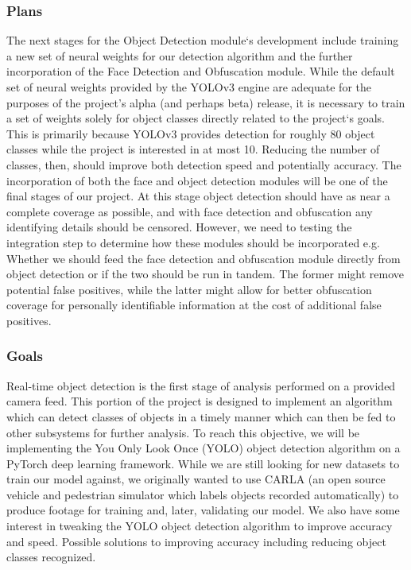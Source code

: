\documentclass[onecolumn, draftclsnofoot,10pt, compsoc]{IEEEtran}
\begin{document}
\subsubsection{Plans}
The next stages for the Object Detection module`s development include training a new set of neural weights for our detection algorithm and the further incorporation of the Face Detection and Obfuscation module. While the default set of neural weights provided by the YOLOv3 engine are adequate for the purposes of the project's alpha (and perhaps beta) release, it is necessary to train a set of weights solely for object classes directly related to the project`s goals. This is primarily because YOLOv3 provides detection for roughly 80 object classes while the project is interested in at most 10. Reducing the number of classes, then, should improve both detection speed and potentially accuracy. The incorporation of both the face and object detection modules will be one of the final stages of our project. At this stage object detection should have as near a complete coverage as possible, and with face detection and obfuscation any identifying details should be censored. However, we need to testing the integration step to determine how these modules should be incorporated e.g. Whether we should feed the face detection and obfuscation module directly from object detection or if the two should be run in tandem. The former might remove potential false positives, while the latter might allow for better obfuscation coverage for personally identifiable information at the cost of additional false positives.

\subsubsection{Goals}
Real-time object detection is the first stage of analysis performed on a provided camera feed. This portion of the project is designed to implement an algorithm which can detect classes of objects in a timely manner which can then be fed to other subsystems for further analysis. To reach this objective, we will be implementing the You Only Look Once (YOLO) object detection algorithm on a PyTorch deep learning framework. While we are still looking for new datasets to train our model against, we originally wanted to use CARLA (an open source vehicle and pedestrian simulator which labels objects recorded automatically) to produce footage for training and, later, validating our model. We also have some interest in tweaking the YOLO object detection algorithm to improve accuracy and speed. Possible solutions to improving accuracy including reducing object classes recognized.
\end{document}
